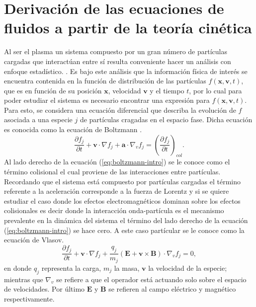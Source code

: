 \documentclass[../tesis_main_file.tex]{subfiles}
\begin{document}
\section{Derivación de las ecuaciones de fluidos a partir de la teoría cinética}
Al ser el plasma un sistema compuesto por un gran número de partículas cargadas que interactúan entre sí resulta conveniente hacer un análisis con enfoque estadístico.  \cite{bittencourt2013fundamentals}.
Es bajo este análisis que la información física de interés se encuentra contenida en la función de distribución de las partículas $f(\textbf{x},\textbf{v},t)$, que es en función de su posición $\textbf{x}$, velocidad $\textbf{v}$ y el tiempo $t$, por lo cual para poder estudiar el sistema es necesario encontrar una expresión para $f(\textbf{x},\textbf{v},t)$.\\
Para esto, se considera una ecuación diferencial que describa la evolución de $f$ asociada a una especie $j$ de partículas cragadas en el espacio fase.
 Dicha ecuación es conocida como la ecuación de Boltzmann \cite{jardin2010computational} .
\begin{equation}
\label{eq:boltzmann-intro}
\frac{\partial f_j}{\partial t}+ \textbf{v}\cdot \nabla f_j + \textbf{a}\cdot \nabla _v f_j=\left(\frac{\partial f_j}{\partial t}\right)_{col}.
\end{equation}
Al lado derecho  de la ecuación (\ref{eq:boltzmann-intro}) se le conoce como el término colisional el cual proviene de las interacciones entre partículas.
Recordando que el sistema está compuesto por partículas cargadas el término referente a la aceleración corresponde a la fuerza de Lorentz y si se quiere estudiar el caso donde los efectos electromagnéticos dominan sobre los efectos colisionales es decir donde la interacción onda-partícula es el mecanismo prevalente en la dinámica del sistema el término del lado derecho de la ecuación (\ref{eq:boltzmann-intro}) se hace cero.
 A este caso partícular se le conoce como la ecuación de Vlasov.
\begin{equation}
\label{eq:boltzmann-vlasov-intro}
\frac{\partial f_j}{\partial t}+ \textbf{v}\cdot \nabla f_j + \frac{q_j}{m_j}\left( \textbf{E} + \textbf{v} \times \textbf{B}\right)\cdot \nabla _v f_j=0,
\end{equation}
en donde $q_j$ representa la carga, $m_j$ la masa, $\textbf{v}$ la velocidad de la especie; mientras que $\nabla _v$ se refiere a que el operador está actuando solo sobre el espacio de velocidades. Por último $\textbf{E}$ y $\textbf{B}$ se refieren al campo eléctrico y magnético respectivamente.\\
\end{document}
